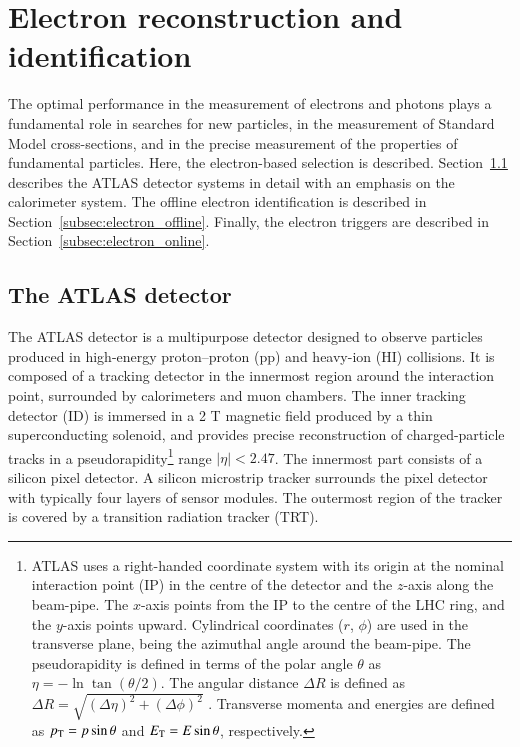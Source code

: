 
\section{Electron reconstruction and identification}\label{sec:atlas}


The optimal performance in the measurement of electrons and photons plays a fundamental role in searches for new particles, in the measurement of Standard Model cross-sections, and in the precise measurement of the properties of fundamental particles. Here, the electron-based selection is described. Section~\ref{subsec:atlas_detector} describes the ATLAS detector systems in detail with an emphasis on the calorimeter system. The offline electron identification is described in Section~\ref{subsec:electron_offline}. Finally, the electron triggers are described in Section~\ref{subsec:electron_online}.



\subsection{The ATLAS detector}\label{subsec:atlas_detector}

The ATLAS detector is a multipurpose detector designed to observe particles produced in high-energy proton–proton (pp) and heavy-ion (HI) collisions. It is composed of a tracking detector in the innermost region around the interaction point, surrounded by calorimeters and muon chambers. The inner tracking detector (ID) is immersed in a 2 T magnetic field produced by a thin superconducting
solenoid, and provides precise reconstruction of charged-particle tracks in a pseudorapidity\footnote{ATLAS uses a right-handed coordinate system with its origin at the nominal interaction point (IP) in the centre of the detector and the $z$-axis along the beam-pipe. The $x$-axis points from the IP to the centre of the LHC ring, and the $y$-axis points upward. Cylindrical coordinates ($r$, $\phi$) are used in the transverse plane, \phi being the azimuthal angle around the beam-pipe. The pseudorapidity is defined in terms of the polar angle $\theta$ as $\eta = -\ln{\tan(\theta/2)}$. The angular distance $\Delta R$ is defined as $\Delta R = \sqrt{(\Delta\eta)^{2} + (\Delta\phi)^{2}}$ . Transverse momenta and energies are defined as $p_{\text{T}} = p\sin\theta$ and $E_{\text{T}} = E\sin\theta$, respectively.} range $|\eta|<2.47$. The innermost part consists of a silicon pixel detector. A silicon microstrip tracker surrounds the pixel detector with typically four layers of sensor modules. The outermost region of the tracker is covered by a transition radiation tracker (TRT).

